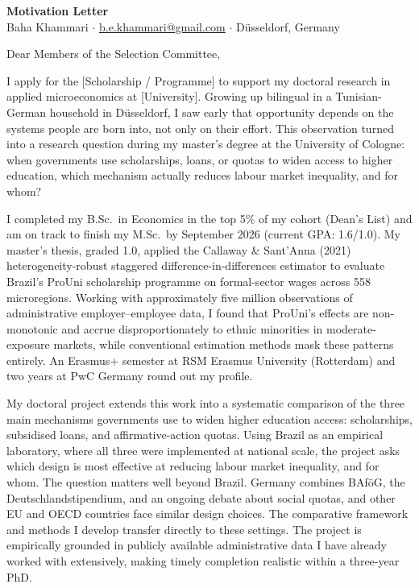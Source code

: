\documentclass[a4paper,11pt]{article}
\begin{document}
\begin{center}
{\large \textbf{Motivation Letter}} \\[4pt]
Baha Khammari \quad $\cdot$ \quad \href{mailto:b.e.khammari@gmail.com}{b.e.khammari@gmail.com} \quad $\cdot$ \quad D\"usseldorf, Germany
\end{center}

\vspace{6pt}


\noindent Dear Members of the Selection Committee,


I apply for the [Scholarship / Programme] to support my doctoral research in applied microeconomics at [University]. Growing up bilingual in a Tunisian-German household in D\"usseldorf, I saw early that opportunity depends on the systems people are born into, not only on their effort. This observation turned into a research question during my master's degree at the University of Cologne: when governments use scholarships, loans, or quotas to widen access to higher education, which mechanism actually reduces labour market inequality, and for whom?


I completed my B.Sc.\ in Economics in the top 5\% of my cohort (Dean's List) and am on track to finish my M.Sc.\ by September 2026 (current GPA: 1.6/1.0). My master's thesis, graded 1.0, applied the Callaway \& Sant'Anna (2021) heterogeneity-robust staggered difference-in-differences estimator to evaluate Brazil's ProUni scholarship programme on formal-sector wages across 558 microregions. Working with approximately five million observations of administrative employer--employee data, I found that ProUni's effects are non-monotonic and accrue disproportionately to ethnic minorities in moderate-exposure markets, while conventional estimation methods mask these patterns entirely. An Erasmus+ semester at RSM Erasmus University (Rotterdam) and two years at PwC Germany round out my profile.


My doctoral project extends this work into a systematic comparison of the three main mechanisms governments use to widen higher education access: scholarships, subsidised loans, and affirmative-action quotas. Using Brazil as an empirical laboratory, where all three were implemented at national scale, the project asks which design is most effective at reducing labour market inequality, and for whom. The question matters well beyond Brazil. Germany combines BAf\"oG, the Deutschlandstipendium, and an ongoing debate about social quotas, and other EU and OECD countries face similar design choices. The comparative framework and methods I develop transfer directly to these settings. The project is empirically grounded in publicly available administrative data I have already worked with extensively, making timely completion realistic within a three-year PhD.
\end{document}
